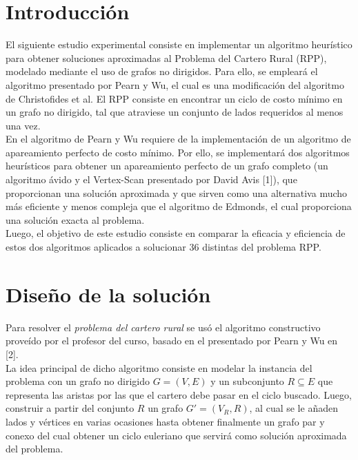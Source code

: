 \documentclass[11pt]{article}
\begin{document}
                                                               
\newpage
                                                    
\section{Introducción}

El siguiente estudio experimental consiste en implementar un algoritmo heurístico para
obtener soluciones aproximadas al Problema del Cartero Rural (RPP), modelado mediante el uso 
de grafos no dirigidos. Para ello, se empleará el algoritmo presentado por Pearn y Wu, el
cual es una modificación del algoritmo de Christofides et al. El RPP consiste en encontrar 
un ciclo de costo mínimo en un grafo no dirigido, tal que atraviese un conjunto de lados 
requeridos al menos una vez. \\

En el algoritmo de Pearn y Wu requiere de la implementación de un algoritmo de apareamiento 
perfecto de costo mínimo. Por ello, se implementará dos algoritmos heurísticos para obtener 
un apareamiento perfecto de un grafo completo (un algoritmo ávido y el Vertex-Scan presentado
por David Avis [1]), que proporcionan una solución aproximada y que sirven como una alternativa
mucho más eficiente y menos compleja que el algoritmo de Edmonds, el cual proporciona una 
solución exacta al problema. \\

Luego, el objetivo de este estudio consiste en comparar la eficacia y eficiencia de estos
dos algoritmos aplicados a solucionar 36 distintas del problema RPP. \\

\section{Diseño de la solución}

Para resolver el \emph{problema del cartero rural} se usó el algoritmo constructivo
proveído por el profesor del curso, basado en el presentado por Pearn y Wu en [2]. \\

La idea principal de dicho algoritmo consiste en modelar la instancia del problema
con un grafo no dirigido $G = (V, E)$ y un subconjunto $R \subseteq E$ que representa
las aristas por las que el cartero debe pasar en el ciclo buscado. Luego, construir a
partir del conjunto $R$ un grafo $G' = (V_R, R)$, al cual se le añaden lados y vértices en varias
ocasiones hasta obtener finalmente un grafo par y conexo del cual obtener un ciclo
euleriano que servirá como solución aproximada del problema. \\
\end{document}
